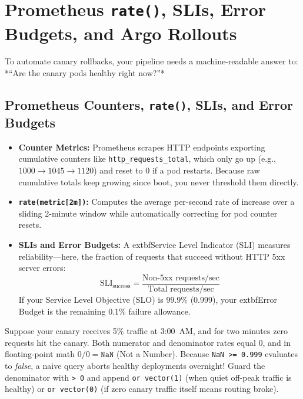 \section{Prometheus \texttt{rate()}, SLIs, Error Budgets, and Argo Rollouts}
\label{sec:v3-ch06-promql-primer}

To automate canary rollbacks, your pipeline needs a machine-readable answer to: *``Are the canary pods healthy right now?''*

\subsection{Prometheus Counters, \texttt{rate()}, SLIs, and Error Budgets}
\begin{itemize}[leftmargin=12pt]
  \item \textbf{Counter Metrics:} Prometheus scrapes HTTP endpoints exporting cumulative counters like \texttt{http\_requests\_total}, which only go up (e.g., $1000 \to 1045 \to 1120$) and reset to $0$ if a pod restarts. Because raw cumulative totals keep growing since boot, you never threshold them directly.
  \item \textbf{\texttt{rate(metric[2m])}:} Computes the average per-second rate of increase over a sliding 2-minute window while automatically correcting for pod counter resets.
  \item \textbf{SLIs and Error Budgets:} A 	extbf{Service Level Indicator (SLI)} measures reliability—here, the fraction of requests that succeed without HTTP 5xx server errors:
  \begin{equation}
  \text{SLI}_{\text{success}} = \frac{\text{Non-5xx requests/sec}}{\text{Total requests/sec}}
  \end{equation}
  If your Service Level Objective (SLO) is $99.9\%$ ($0.999$), your 	extbf{Error Budget} is the remaining $0.1\%$ failure allowance.
\end{itemize}

\begin{intuitionbox}
Suppose your canary receives 5\% traffic at 3:00~AM, and for two minutes zero requests hit the canary. Both numerator and denominator rates equal $0$, and in floating-point math $0 / 0 = \texttt{NaN}$ (Not a Number). Because \texttt{NaN >= 0.999} evaluates to \emph{false}, a naive query aborts healthy deployments overnight! Guard the denominator with \texttt{> 0} and append \texttt{or vector(1)} (when quiet off-peak traffic is healthy) or \texttt{or vector(0)} (if zero canary traffic itself means routing broke).
\end{intuitionbox}

